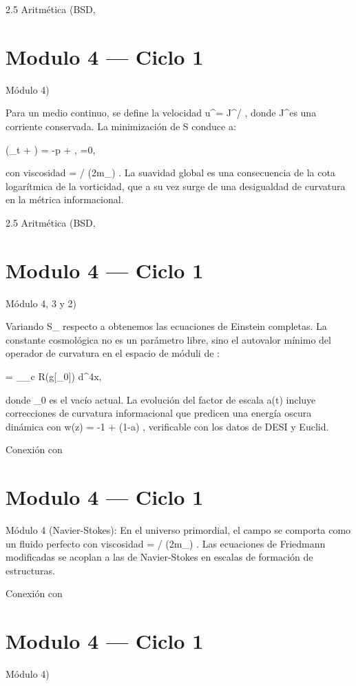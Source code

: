 \documentclass[12pt,twoside]{book}
\begin{document}
2.5 Aritmética (BSD, 

\chapter{Modulo 4 — Ciclo 1}
Módulo 4)

Para un medio continuo, se define la velocidad  u^\mu = J^\mu / \rho , donde  J^\mu  es una corriente conservada. La minimización de  S  conduce a:

\rho (\partial_t  + \cdot\nabla{}) = -\nabla p + \nu \Delta {},
\quad \nabla\cdot{}=0,

con viscosidad  \nu = \hbar / (2m_{}) . La suavidad global es una consecuencia de la cota logarítmica de la vorticidad, que a su vez surge de una desigualdad de curvatura en la métrica informacional.

2.5 Aritmética (BSD, 

\chapter{Modulo 4 — Ciclo 1}
Módulo 4, 3 y 2)

Variando  S_{}  respecto a  \rho  obtenemos las ecuaciones de Einstein completas. La constante cosmológica  \Lambda  no es un parámetro libre, sino el autovalor mínimo del operador de curvatura en el espacio de móduli de  \rho :

\Lambda =  \int_{_c} R(g[\rho_0])  d^4x,

donde  \rho_0  es el vacío actual. La evolución del factor de escala  a(t)  incluye correcciones de curvatura informacional que predicen una energía oscura dinámica con  w(z) = -1 + \epsilon (1-a) , verificable con los datos de DESI y Euclid.

Conexión con 

\chapter{Modulo 4 — Ciclo 1}
Módulo 4 (Navier-Stokes): En el universo primordial, el campo  \rho  se comporta como un fluido perfecto con viscosidad  \nu = \hbar / (2m_{}) . Las ecuaciones de Friedmann modificadas se acoplan a las de Navier-Stokes en escalas de formación de estructuras.

Conexión con 

\chapter{Modulo 4 — Ciclo 1}
Módulo 4)
\end{document}
